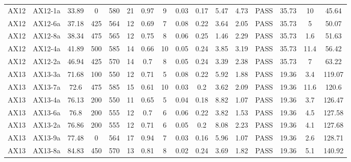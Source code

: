 \documentclass[9pt,twoside,lineno]{pnas-new}
\begin{document}
\begin{table}
\begin{tabular}{cccccccccccccccc}
AX12 & AX12-1a  & 33.89     & 0         & 580       & 21 & 0.97 & 9     & 0.03    & 0.17    & 5.47           & 4.73            & PASS & 35.73         & 10       & 45.64         \\
AX12 & AX12-6a  & 37.18     & 425       & 564       & 12 & 0.69 & 7     & 0.08    & 0.22    & 3.64           & 2.05            & PASS & 35.73         & 5        & 50.07         \\
AX12 & AX12-8a  & 38.34     & 475       & 565       & 12 & 0.75 & 8     & 0.06    & 0.25    & 1.46           & 2.29            & PASS & 35.73         & 1.6      & 51.63         \\
AX12 & AX12-4a  & 41.89     & 500       & 585       & 14 & 0.66 & 10    & 0.05    & 0.24    & 3.85           & 3.19            & PASS & 35.73         & 11.4     & 56.42         \\
AX12 & AX12-2a  & 46.94     & 425       & 570       & 14 & 0.7  & 8     & 0.05    & 0.24    & 3.39           & 2.38            & PASS & 35.73         & 7        & 63.22         \\
AX13 & AX13-3a  & 71.68     & 100       & 550       & 12 & 0.71 & 5     & 0.08    & 0.22    & 5.92           & 1.88            & PASS & 19.36         & 3.4      & 119.07        \\
AX13 & AX13-7a  & 72.6      & 475       & 585       & 15 & 0.61 & 10    & 0.03    & 0.2     & 3.62           & 2.09            & PASS & 19.36         & 11.6     & 120.6         \\
AX13 & AX13-4a  & 76.13     & 200       & 550       & 11 & 0.65 & 5     & 0.04    & 0.18    & 8.82           & 1.07            & PASS & 19.36         & 3.7      & 126.47        \\
AX13 & AX13-6a  & 76.8      & 200       & 555       & 12 & 0.7  & 6     & 0.06    & 0.22    & 3.82           & 1.53            & PASS & 19.36         & 4.5      & 127.58        \\
AX13 & AX13-2a  & 76.86     & 200       & 555       & 12 & 0.71 & 6     & 0.05    & 0.2     & 8.08           & 2.23            & PASS & 19.36         & 4.1      & 127.68        \\
AX13 & AX13-9a  & 77.48     & 0         & 564       & 17 & 0.94 & 7     & 0.03    & 0.16    & 5.96           & 1.07            & PASS & 19.36         & 2.6      & 128.71        \\
AX13 & AX13-8a  & 84.83     & 450       & 570       & 13 & 0.81 & 8     & 0.02    & 0.24    & 3.69           & 1.82            & PASS & 19.36         & 5.1      & 140.92        \\

\end{tabular}
\end{table}
\end{document}
